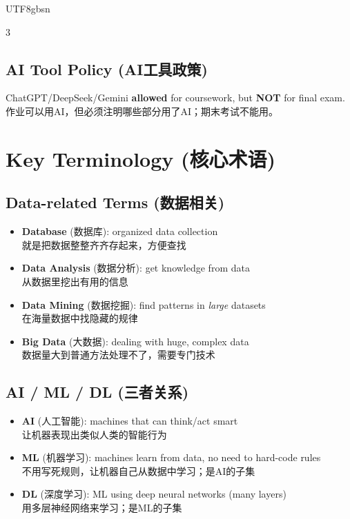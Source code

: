 \documentclass[10pt,landscape,a4paper]{article}
\newcommand{\zhint}[1]{{\scriptsize\color{gray!70!black}#1}}
\begin{document}
\begin{CJK}{UTF8}{gbsn}
\begin{multicols}{3}
\subsection{AI Tool Policy \zhint{(AI工具政策)}}
ChatGPT/DeepSeek/Gemini \textbf{allowed} for coursework, but \textbf{NOT} for final exam.\\
\zhint{作业可以用AI，但必须注明哪些部分用了AI；期末考试不能用。}

\section{Key Terminology \zhint{(核心术语)}}

\subsection{Data-related Terms \zhint{(数据相关)}}
\begin{itemize}[leftmargin=*, nosep, itemsep=1pt]
    \item \textbf{Database} \zhint{(数据库)}: organized data collection\\
    \zhint{就是把数据整整齐齐存起来，方便查找}
    \item \textbf{Data Analysis} \zhint{(数据分析)}: get knowledge from data\\
    \zhint{从数据里挖出有用的信息}
    \item \textbf{Data Mining} \zhint{(数据挖掘)}: find patterns in \emph{large} datasets\\
    \zhint{在海量数据中找隐藏的规律}
    \item \textbf{Big Data} \zhint{(大数据)}: dealing with huge, complex data\\
    \zhint{数据量大到普通方法处理不了，需要专门技术}
\end{itemize}

\subsection{AI / ML / DL \zhint{(三者关系)}}
\begin{itemize}[leftmargin=*, nosep, itemsep=1pt]
    \item \textbf{AI} \zhint{(人工智能)}: machines that can think/act smart\\
    \zhint{让机器表现出类似人类的智能行为}
    \item \textbf{ML} \zhint{(机器学习)}: machines learn from data, no need to hard-code rules\\
    \zhint{不用写死规则，让机器自己从数据中学习；是AI的子集}
    \item \textbf{DL} \zhint{(深度学习)}: ML using deep neural networks (many layers)\\
    \zhint{用多层神经网络来学习；是ML的子集}
\end{itemize}


\end{multicols}
\end{CJK}
\end{document}

